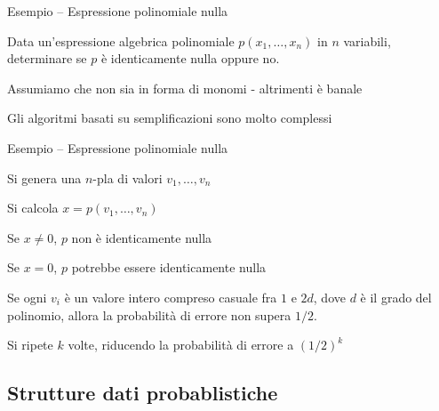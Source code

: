 \begin{frame}{Esempio -- Espressione polinomiale nulla}

\vspace{-9pt}
\begin{myboxtitle}[Problema]
Data un’espressione algebrica polinomiale $p(x_1 , \ldots , x_n)$ 
in $n$ variabili, determinare se $p$ è identicamente nulla oppure no.
\end{myboxtitle}

\begin{myboxtitle}[Discussione]
\BIL
\item Assumiamo che non sia in forma di monomi - altrimenti è banale
\item Gli algoritmi basati su semplificazioni sono molto complessi
\EIL
\end{myboxtitle}

\end{frame}


\begin{frame}{Esempio -- Espressione polinomiale nulla}

\vspace{-9pt}
\begin{myboxtitle}[Algoritmo]
\BIL
\item Si genera una $n$-pla di valori $v_1, \ldots, v_n$
\item Si calcola $x= p(v_1 , \ldots , v_n)$
  \BI
	\item Se $x \neq 0$, $p$ non è identicamente nulla
	\item Se $x = 0$, $p$ \alert{potrebbe} essere identicamente nulla
	\EI
\item Se ogni $v_i$ è un valore intero compreso casuale fra $1$ e $2d$, dove $d$ è 
il grado del polinomio, allora la probabilità di errore non supera $1/2$.
\item Si ripete $k$ volte, riducendo la probabilità di errore a $(1/2)^k$
\EIL
\end{myboxtitle}

\end{frame}

\subsection{Strutture dati probablistiche}


